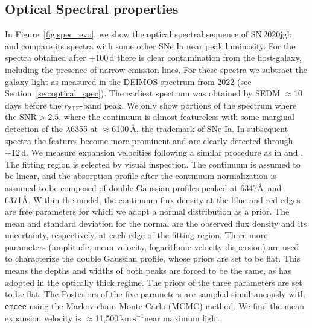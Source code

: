 \documentclass[twocolumn]{aastex631}
\newcommand{\sn}{SN\,2020jgb}
\newcommand{\kms}{$\mathrm{km}\,\mathrm{s}^{-1}$}
\begin{document}
\subsection{Optical Spectral properties}
In Figure~\ref{fig:spec_evo}, we show the optical spectral sequence of \sn, and compare its spectra with some other SNe Ia near peak luminosity. For the spectra obtained after +100\,d there is clear contamination from the host-galaxy, including the presence of narrow emission lines. For these spectra we subtract the galaxy light as measured in the DEIMOS spectrum from 2022 (see Section~\ref{sec:optical_spec}). The earliest spectrum was obtained by SEDM $\approx$10\,days before the $r_\mathrm{ZTF}$-band peak. We only show portions of the spectrum where the $\mathrm{SNR}>2.5$, where the continuum is almost featureless with some marginal detection of the  $\lambda$6355 at $\approx$6100\,\AA, the trademark of SNe Ia. In subsequent spectra the  features become more prominent and are clearly detected through +12\,d. We measure  expansion velocities following a similar procedure as in \citet{Childress_2013,Childress_2014} and \citet{Maguire_2014}. The fitting region is selected by visual inspection. The continuum is assumed to be linear, and the absorption profile after the continuum normalization is assumed to be composed of double Gaussian profiles peaked at 6347\AA\ and 6371\AA. Within the model, the continuum flux density at the blue and red edges are free parameters for which we adopt a normal distribution as a prior. The mean and standard deviation for the normal are the observed flux density and its uncertainty, respectively, at each edge of the fitting region. Three more parameters (amplitude, mean velocity, logarithmic velocity dispersion) are used to characterize the double Gaussian profile, whose priors are set to be flat. This means the depths and widths of both peaks are forced to be the same, as \citet{Maguire_2014} has adopted in the optically thick regime. The priors of the three parameters are set to be flat. The Posteriors of the five parameters are sampled simultaneously with \texttt{emcee} \citep{emcee_2013} using the Markov chain Monte Carlo (MCMC) method. We find the mean expansion velocity is $\approx$11,500\,\kms near maximum light.
\end{document}
